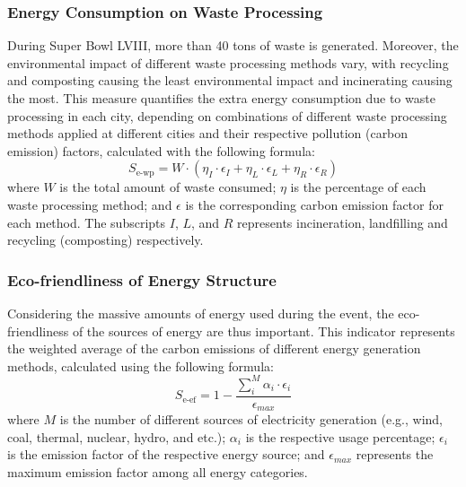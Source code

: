\documentclass{mcmthesis}
\begin{document}
\subsubsection{Energy Consumption on Waste Processing} \label{subsubsec:indicator_waste_processing}

During Super Bowl LVIII, more than 40 tons of waste is generated. Moreover, the environmental impact of different waste processing methods vary, with recycling and composting causing the least environmental impact and incinerating causing the most. This measure quantifies the extra energy consumption due to waste processing in each city, depending on combinations of different waste processing methods applied at different cities and their respective pollution (carbon emission) factors, calculated with the following formula: 
\begin{equation} \label{eq:waste_processing}
    S_\text{e-wp} = W \cdot \left( \eta_I \cdot \epsilon_I + \eta_L \cdot \epsilon_L + \eta_R \cdot \epsilon_R \right)
\end{equation}
where $W$ is the total amount of waste consumed; $\eta$ is the percentage of each waste processing method; and $\epsilon$ is the corresponding carbon emission factor for each method. The subscripts $I$, $L$, and $R$ represents incineration, landfilling and recycling (composting) respectively.



\subsubsection{Eco-friendliness of Energy Structure} \label{subsubsec:indicator_energy_structure}

Considering the massive amounts of energy used during the event, the eco-friendliness of the sources of energy are thus important. This indicator represents the weighted average of the carbon emissions of different energy generation methods, calculated using the following formula: 
\begin{equation} \label{eq:energy_structure}
S_\text{e-ef} = 1 - \frac{\sum^M_i \alpha_i \cdot \epsilon_i} {\epsilon_{max}}
\end{equation} where $M$ is the number of different sources of electricity generation (e.g., wind, coal, thermal, nuclear, hydro, and etc.);  $\alpha_i$ is the respective usage percentage; $\epsilon_i$ is the emission factor of the respective energy source; and $\epsilon_{max}$ represents the maximum emission factor among all energy categories.
\end{document}

